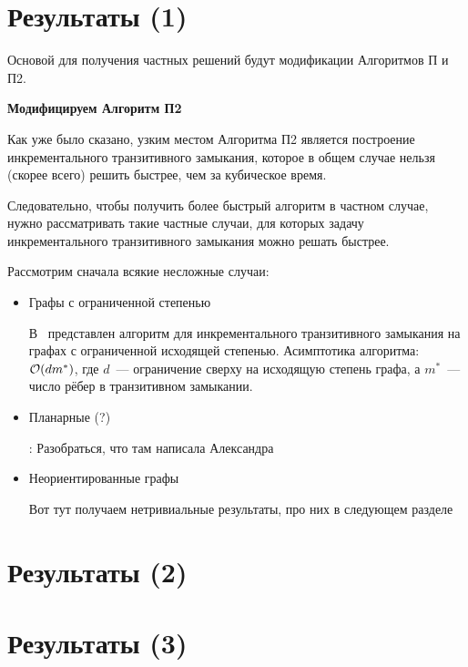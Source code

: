 \section{Результаты (1)}

Основой для получения частных решений будут модификации Алгоритмов П и П2.

{\bf Модифицируем Алгоритм П2}

Как уже было сказано, узким местом Алгоритма П2 является построение инкрементального транзитивного замыкания, которое в общем случае нельзя (скорее всего) решить быстрее, чем за кубическое время.

Следовательно, чтобы получить более быстрый алгоритм в частном случае, нужно рассматривать такие частные случаи, для которых задачу инкрементального транзитивного замыкания можно решать быстрее.

Рассмотрим сначала всякие несложные случаи:

\begin{itemize}
    \item Графы с ограниченной степенью

    В~\cite{Yellin1993} представлен алгоритм для инкрементального транзитивного замыкания на графах с ограниченной исходящей степенью. Асимптотика алгоритма: $\mathcal{O}(d m^{*})$, где $d$~--- ограничение сверху на исходящую степень графа, а $m^{*}$~--- число рёбер в транзитивном замыкании.
    \item Планарные (?)

    \TODO: Разобраться, что там написала Александра 
    
    \item Неориентированные графы

    Вот тут получаем нетривиальные результаты, про них в следующем разделе
\end{itemize}





\section{Результаты (2)}



\section{Результаты (3)}


